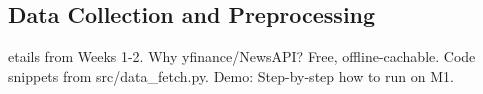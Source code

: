\subsection{Data Collection and Preprocessing}
\label{sec:data}

etails from Weeks 1-2. Why yfinance/NewsAPI? Free, offline-cachable. Code snippets from src/data\_fetch.py. Demo: Step-by-step how to run on M1.